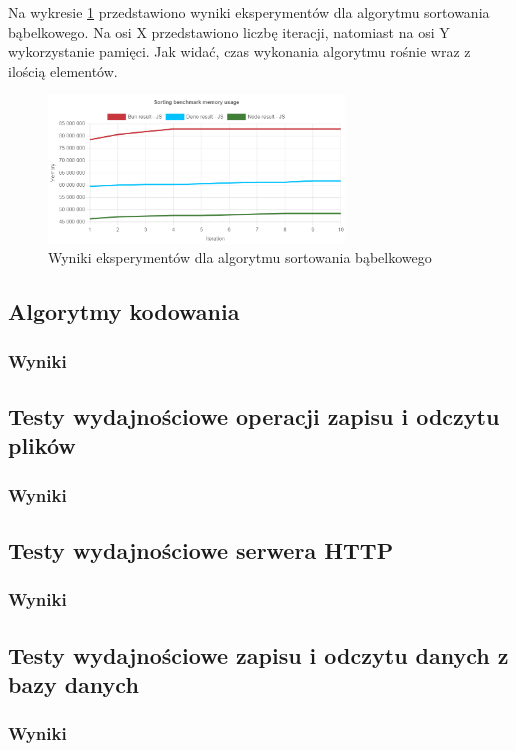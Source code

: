 Na wykresie \ref{fig:bubble_sorting_e1_memory} przedstawiono wyniki eksperymentów dla algorytmu sortowania bąbelkowego. Na osi X przedstawiono liczbę iteracji, natomiast na osi Y wykorzystanie pamięci. Jak widać, czas wykonania algorytmu rośnie wraz z ilością elementów.
\begin{figure}[h]
  \centering
  \includegraphics[width=0.7\textwidth]{Figures/sorting/bubble/e1_memory_js.png}
  \caption{Wyniki eksperymentów dla algorytmu sortowania bąbelkowego}
  \label{fig:bubble_sorting_e1_memory}
\end{figure}


\subsection{Algorytmy kodowania}

\subsubsection{Wyniki}

\subsection{Testy wydajnościowe operacji zapisu i odczytu plików}

\subsubsection{Wyniki}

\subsection{Testy wydajnościowe serwera HTTP}

\subsubsection{Wyniki}

\subsection{Testy wydajnościowe zapisu i odczytu danych z bazy danych}

\subsubsection{Wyniki}